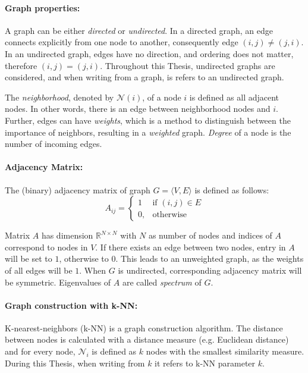 \paragraph{Graph properties:}
A graph can be either \textit{directed} or \textit{undirected}. 
In a directed graph, an edge connects explicitly from one node to another, consequently edge $(i, j) \neq (j, i)$. 
In an undirected graph, edges have no direction, and ordering does not matter, therefore $(i, j) = (j, i)$.
Throughout this Thesis, undirected graphs are considered, and when writing from a graph, is refers to an undirected graph.

The \textit{neighborhood}, denoted by $\mathcal{N}(i)$, of a node $i$  is defined as all adjacent nodes.
In other words, there is an edge between neighborhood nodes and $i$. 
Further, edges can have \textit{weights}, which is a method to distinguish between the importance of neighbors, resulting in a \textit{weighted} graph.
\textit{Degree} of a node is the number of incoming edges.

\paragraph{Adjacency Matrix:}
The (binary) adjacency matrix of graph $G = \langle V, E \rangle$ is defined as follows:
\begin{equation}
    \label{eg:AdjacencyMatrix}
    A_{ij} =    
    \begin{cases}
        1  & \text{if } (i, j) \in E \\
        0, & \text{otherwise}
    \end{cases}
\end{equation}

Matrix $A$ has dimension $\mathbb{R}^{N \times N}$ with $N$ as number of nodes
and indices of $A$ correspond to nodes in $V$.
If there exists an edge between two nodes, entry in $A$ will be set to $1$, otherwise to $0$.
This leads to an unweighted graph, as the weights of all edges will be $1$.
When $G$ is undirected, corresponding adjacency matrix will be symmetric. 
Eigenvalues of $A$ are called \textit{spectrum} of $G$.

\paragraph{Graph construction with k-NN:}
K-nearest-neighbors (k-NN) is a graph construction algorithm. The distance between
nodes is calculated with a distance measure (e.g. Euclidean distance) and 
for every node, $\mathcal{N}_i$ is defined as $k$ nodes with the smallest similarity measure.
During this Thesis, when writing from $k$ it refers to k-NN parameter $k$.

